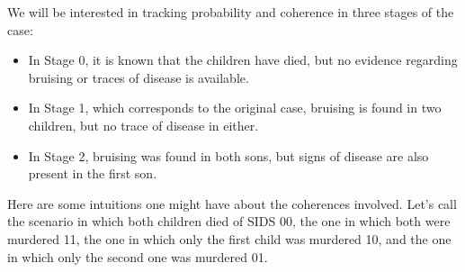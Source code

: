 \documentclass[10pt,]{scrartcl}
\begin{document}
We will be interested in tracking probability and coherence in three stages of the case: 
\begin{itemize} 
\item In \textsf{Stage 0}, it is known that the children have died, but no evidence regarding bruising or traces of disease is available.

\item In \textsf{Stage 1}, which corresponds to the original case, bruising is found in two children, but no trace of disease in either.

\item In \textsf{Stage 2}, bruising was found in both sons, but signs of disease are also present in the first son. 
\end{itemize}



Here  are some intuitions one might have about the coherences involved. Let's call the scenario in which both children died of SIDS 00, the one in which both were murdered 11, the one in which only the first child was murdered 10, and the one in which only the second one was murdered 01.
\end{document}
